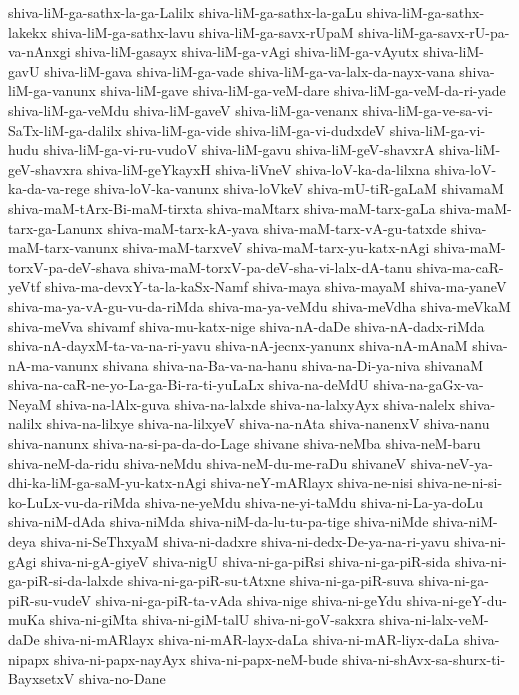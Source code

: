 {shiva-liM-ga-sathx-la-ga-Lalilx
shiva-liM-ga-sathx-la-gaLu
shiva-liM-ga-sathx-lakekx
shiva-liM-ga-sathx-lavu
shiva-liM-ga-savx-rUpaM
shiva-liM-ga-savx-rU-pa-va-nAnxgi
shiva-liM-gasayx
shiva-liM-ga-vAgi
shiva-liM-ga-vAyutx
shiva-liM-gavU
shiva-liM-gava
shiva-liM-ga-vade
shiva-liM-ga-va-lalx-da-nayx-vana
shiva-liM-ga-vanunx
shiva-liM-gave
shiva-liM-ga-veM-dare
shiva-liM-ga-veM-da-ri-yade
shiva-liM-ga-veMdu
shiva-liM-gaveV
shiva-liM-ga-venanx
shiva-liM-ga-ve-sa-vi-SaTx-liM-ga-dalilx
shiva-liM-ga-vide
shiva-liM-ga-vi-dudxdeV
shiva-liM-ga-vi-hudu
shiva-liM-ga-vi-ru-vudoV
shiva-liM-gavu
shiva-liM-geV-shavxrA
shiva-liM-geV-shavxra
shiva-liM-geYkayxH
shiva-liVneV
shiva-loV-ka-da-lilxna
shiva-loV-ka-da-va-rege
shiva-loV-ka-vanunx
shiva-loVkeV
shiva-mU-tiR-gaLaM
shivamaM
shiva-maM-tArx-Bi-maM-tirxta
shiva-maMtarx
shiva-maM-tarx-gaLa
shiva-maM-tarx-ga-Lanunx
shiva-maM-tarx-kA-yava
shiva-maM-tarx-vA-gu-tatxde
shiva-maM-tarx-vanunx
shiva-maM-tarxveV
shiva-maM-tarx-yu-katx-nAgi
shiva-maM-torxV-pa-deV-shava
shiva-maM-torxV-pa-deV-sha-vi-lalx-dA-tanu
shiva-ma-caR-yeVtf
shiva-ma-devxY-ta-la-kaSx-Namf
shiva-maya
shiva-mayaM
shiva-ma-yaneV
shiva-ma-ya-vA-gu-vu-da-riMda
shiva-ma-ya-veMdu
shiva-meVdha
shiva-meVkaM
shiva-meVva
shivamf
shiva-mu-katx-nige
shiva-nA-daDe
shiva-nA-dadx-riMda
shiva-nA-dayxM-ta-va-na-ri-yavu
shiva-nA-jecnx-yanunx
shiva-nA-mAnaM
shiva-nA-ma-vanunx
shivana
shiva-na-Ba-va-na-hanu
shiva-na-Di-ya-niva
shivanaM
shiva-na-caR-ne-yo-La-ga-Bi-ra-ti-yuLaLx
shiva-na-deMdU
shiva-na-gaGx-va-NeyaM
shiva-na-lAlx-guva
shiva-na-lalxde
shiva-na-lalxyAyx
shiva-nalelx
shiva-nalilx
shiva-na-lilxye
shiva-na-lilxyeV
shiva-na-nAta
shiva-nanenxV
shiva-nanu
shiva-nanunx
shiva-na-si-pa-da-do-Lage
shivane
shiva-neMba
shiva-neM-baru
shiva-neM-da-ridu
shiva-neMdu
shiva-neM-du-me-raDu
shivaneV
shiva-neV-ya-dhi-ka-liM-ga-saM-yu-katx-nAgi
shiva-neY-mARlayx
shiva-ne-nisi
shiva-ne-ni-si-ko-LuLx-vu-da-riMda
shiva-ne-yeMdu
shiva-ne-yi-taMdu
shiva-ni-La-ya-doLu
shiva-niM-dAda
shiva-niMda
shiva-niM-da-lu-tu-pa-tige
shiva-niMde
shiva-niM-deya
shiva-ni-SeThxyaM
shiva-ni-dadxre
shiva-ni-dedx-De-ya-na-ri-yavu
shiva-ni-gAgi
shiva-ni-gA-giyeV
shiva-nigU
shiva-ni-ga-piRsi
shiva-ni-ga-piR-sida
shiva-ni-ga-piR-si-da-lalxde
shiva-ni-ga-piR-su-tAtxne
shiva-ni-ga-piR-suva
shiva-ni-ga-piR-su-vudeV
shiva-ni-ga-piR-ta-vAda
shiva-nige
shiva-ni-geYdu
shiva-ni-geY-du-muKa
shiva-ni-giMta
shiva-ni-giM-talU
shiva-ni-goV-sakxra
shiva-ni-lalx-veM-daDe
shiva-ni-mARlayx
shiva-ni-mAR-layx-daLa
shiva-ni-mAR-liyx-daLa
shiva-nipapx
shiva-ni-papx-nayAyx
shiva-ni-papx-neM-bude
shiva-ni-shAvx-sa-shurx-ti-BayxsetxV
shiva-no-Dane
}
